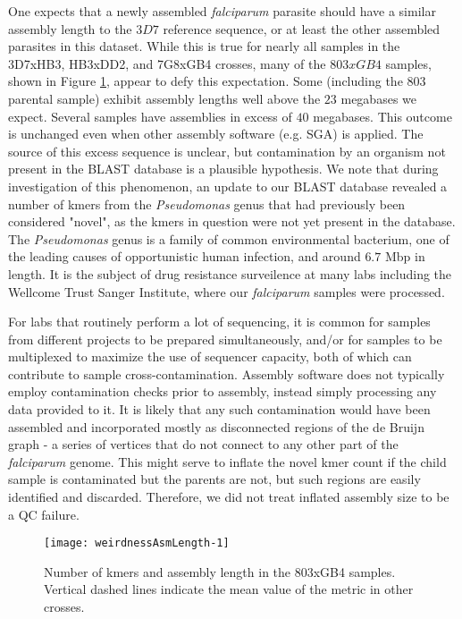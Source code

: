 One expects that a newly assembled \textit{falciparum} parasite should have a similar assembly length to the $3D7$ reference sequence, or at least the other assembled parasites in this dataset.  While this is true for nearly all samples in the 3D7xHB3, HB3xDD2, and 7G8xGB4 crosses, many of the $803xGB4$ samples, shown in Figure \ref{fig:weirdnessAsmLength}, appear to defy this expectation.  Some (including the $803$ parental sample) exhibit assembly lengths well above the $23$ megabases we expect.  Several samples have assemblies in excess of $40$ megabases.  This outcome is unchanged even when other assembly software (e.g. SGA) is applied.  The source of this excess sequence is unclear, but contamination by an organism not present in the BLAST database is a plausible hypothesis.  We note that during investigation of this phenomenon, an update to our BLAST database revealed a number of kmers from the \textit{Pseudomonas} genus that had previously been considered "novel", as the kmers in question were not yet present in the database.  The \textit{Pseudomonas} genus is a family of common environmental bacterium, one of the leading causes of opportunistic human infection\cite{Stover:2000dy}, and around $6.7$ Mbp in length.  It is the subject of drug resistance surveilence\cite{Winsor:2016ca} at many labs including the Wellcome Trust Sanger Institute, where our \textit{falciparum} samples were processed.

For labs that routinely perform a lot of sequencing, it is common for samples from different projects to be prepared simultaneously, and/or for samples to be multiplexed to maximize the use of sequencer capacity, both of which can contribute to sample cross-contamination\cite{Jun:2012je}.  Assembly software does not typically employ contamination checks prior to assembly, instead simply processing any data provided to it.  It is likely that any such contamination would have been assembled and incorporated mostly as disconnected regions of the de Bruijn graph - a series of vertices that do not connect to any other part of the \textit{falciparum} genome.  This might serve to inflate the novel kmer count if the child sample is contaminated but the parents are not, but such regions are easily identified and discarded.  Therefore, we did not treat inflated assembly size to be a QC failure.

\begin{figure}[h!]
  \centering
    \texttt{[image: weirdnessAsmLength-1]}
  \caption{Number of kmers and assembly length in the 803xGB4 samples.  Vertical dashed lines indicate the mean value of the metric in other crosses.}
  \label{fig:weirdnessAsmLength}
\end{figure}

